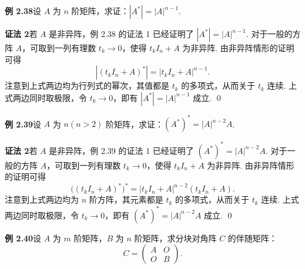 \documentclass[UTF8, 12pt, fontset=fandol, oneside]{ctexart}
\begin{document}
\noindent\textbf{例 2.38}\quad 设 $A$ 为 $n$ 阶矩阵，求证：$|A^*|=|A|^{n-1}$.

\noindent\textbf{证法 2}\quad 若 $A$ 是非异阵，例 2.38 的证法 1 已经证明了 $|A^*|=|A|^{n-1}$. 对于一般的方阵 $A$，可取到一列有理数 $t_k\to0$，使得 $t_kI_n+A$ 为非异阵. 由非异阵情形的证明可得
\[
|(t_kI_n+A)^*|=|t_kI_n+A|^{n-1}.
\]
注意到上式两边均为行列式的幂次，其值都是 $t_k$ 的多项式，从而关于 $t_k$ 连续. 上式两边同时取极限，令 $t_k\to0$，即有 $|A^*|=|A|^{n-1}$ 成立. \qed

\noindent\textbf{例 2.39}\quad 设 $A$ 为 $n(n>2)$ 阶矩阵，求证：$(A^*)^*=|A|^{n-2}A$.

\noindent\textbf{证法 2}\quad 若 $A$ 是非异阵，例 2.39 的证法 1 已经证明了 $(A^*)^*=|A|^{n-2}A$. 对于一般的方阵 $A$，可取到一列有理数 $t_k\to0$，使得 $t_kI_n+A$ 为非异阵. 由非异阵情形的证明可得
\[
\bigl((t_kI_n+A)^*\bigr)^*=|t_kI_n+A|^{n-2}(t_kI_n+A).
\]
注意到上式两边均为 $n$ 阶方阵，其元素都是 $t_k$ 的多项式，从而关于 $t_k$ 连续. 上式两边同时取极限，令 $t_k\to0$，即有 $(A^*)^*=|A|^{n-2}A$ 成立. \qed

\noindent\textbf{例 2.40}\quad 设 $A$ 为 $m$ 阶矩阵，$B$ 为 $n$ 阶矩阵，求分块对角阵 $C$ 的伴随矩阵：
\[
C=
\left(
\begin{array}{cc}
A & O\\
O & B
\end{array}
\right).
\]
\end{document}
